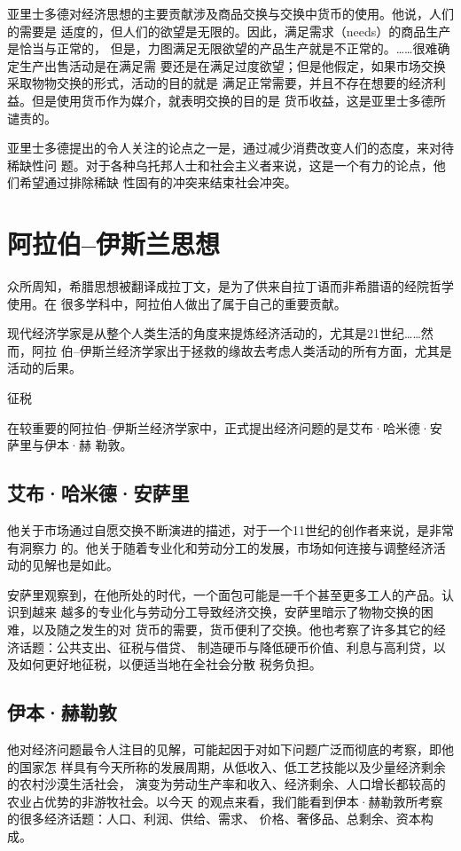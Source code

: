 亚里士多德对经济思想的主要贡献涉及商品交换与交换中货币的使用。他说，人们的需要是
适度的，但人们的欲望是无限的。因此，满足需求（needs）的商品生产是恰当与正常的，
但是，力图满足无限欲望的产品生产就是不正常的。……很难确定生产出售活动是在满足需
要还是在满足过度欲望；但是他假定，如果市场交换采取物物交换的形式，活动的目的就是
满足正常需要，并且不存在想要的经济利益。但是使用货币作为媒介，就表明交换的目的是
货币收益，这是亚里士多德所谴责的。

亚里士多德提出的令人关注的论点之一是，通过减少消费改变人们的态度，来对待稀缺性问
题。对于各种乌托邦人士和社会主义者来说，这是一个有力的论点，他们希望通过排除稀缺
性固有的冲突来结束社会冲突。

\section{阿拉伯--伊斯兰思想}

众所周知，希腊思想被翻译成拉丁文，是为了供来自拉丁语而非希腊语的经院哲学使用。在
很多学科中，阿拉伯人做出了属于自己的重要贡献。

现代经济学家是从整个人类生活的角度来提炼经济活动的，尤其是21世纪……然而，阿拉
伯--伊斯兰经济学家出于拯救的缘故去考虑人类活动的所有方面，尤其是活动的后果。

征税

在较重要的阿拉伯--伊斯兰经济学家中，正式提出经济问题的是艾布·哈米德·安萨里与伊本·赫
勒敦。

\subsection{艾布·哈米德·安萨里}

他关于市场通过自愿交换不断演进的描述，对于一个11世纪的创作者来说，是非常有洞察力
的。他关于随着专业化和劳动分工的发展，市场如何连接与调整经济活动的见解也是如此。

安萨里观察到，在他所处的时代，一个面包可能是一千个甚至更多工人的产品。认识到越来
越多的专业化与劳动分工导致经济交换，安萨里暗示了物物交换的困难，以及随之发生的对
货币的需要，货币便利了交换。他也考察了许多其它的经济话题：公共支出、征税与借贷、
制造硬币与降低硬币价值、利息与高利贷，以及如何更好地征税，以便适当地在全社会分散
税务负担。

\subsection{伊本·赫勒敦}

他对经济问题最令人注目的见解，可能起因于对如下问题广泛而彻底的考察，即他的国家怎
样具有今天所称的发展周期，从低收入、低工艺技能以及少量经济剩余的农村沙漠生活社会，
演变为劳动生产率和收入、经济剩余、人口增长都较高的农业占优势的非游牧社会。以今天
的观点来看，我们能看到伊本·赫勒敦所考察的很多经济话题：人口、利润、供给、需求、
价格、奢侈品、总剩余、资本构成。

